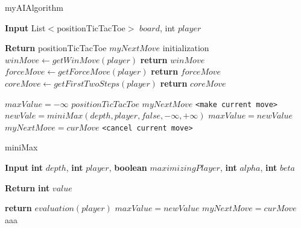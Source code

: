 \documentclass[a4paper]{article}
\begin{document}
\begin{algorithm}
\caption{myAIAlgorithm}
\begin{algorithmic}[]

\State \textbf{Input} List$<$positionTicTacToe$>$ $board$, int $player$

\State \textbf{Return} positionTicTacToe $myNextMove$
\State
{}     
\State
\State initialization
\State
\State $ winMove \gets getWinMove(player)$  
    \State  \textbf{return} $winMove$
\EndIf
\State
\State $ forceMove \gets getForceMove(player)$  
    \State  \textbf{return} $forceMove$
\EndIf
\State
\State $ coreMove \gets getFirstTwoSteps(player)$  
    \State  \textbf{return} $coreMove$
\EndIf
\State

\State $maxValue = -\infty$
\State $positionTicTacToe$ $myNextMove$
\State
\Do {}
        \State \texttt{<make current move>}
	  \State $newVale = miniMax(depth, player, false, -\infty, +\infty)$
    	           \State  $maxValue = newValue$
		     \State $myNextMove =curMove$
         \EndIf
	   \State \texttt{<cancel current move>}  
      \EndFor

\EndProcedure
\end{algorithmic}
\end{algorithm}

\begin{algorithm}
\caption{miniMax}
\begin{algorithmic}[]

\State \textbf{Input} \textbf{int} $depth$, \textbf{int} $player$, \textbf{boolean} $maximizingPlayer$, \textbf{int} $alpha$, \textbf{int} $beta$

\State \textbf{Return} \textbf{int} $value$

 
	\State \textbf{return} $evaluation(player)$  
\EndIf
{}  
    	\State  $maxValue = newValue$
	\State $myNextMove =curMove$
\Else  {}
\State aaa
\EndIf


\EndProcedure
\end{algorithmic}
\end{algorithm}
\end{document}
